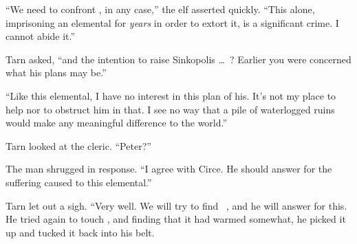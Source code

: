 ``We need to confront \mothzam, in any case,'' the elf asserted quickly.  ``This alone, imprisoning an elemental for \emph{years} in order to extort it, is a significant crime.  I cannot abide it.''

Tarn asked, ``and the intention to raise Sinkopolis \ldots\ \valdunmir?  Earlier you were concerned what his plans may be.''

``Like this elemental, I have no interest in this plan of his.  It's not my place to help nor to obstruct him in that.  I see no way that a pile of waterlogged ruins would make any meaningful difference to the world.''

Tarn looked at the cleric.  ``Peter?''

The man shrugged in response.  ``I agree with Circe.  He should answer for the suffering caused to this elemental.''

Tarn let out a sigh.  ``Very well.  We will try to find \mothzam\ \driktur, and he will answer for this.  He tried again to touch \kildir, and finding that it had warmed somewhat, he picked it up and tucked it back into his belt.


















